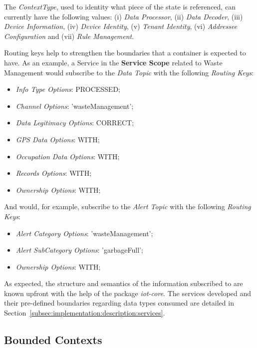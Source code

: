 The \textit{ContextType}, used to identity what piece of the state is referenced, can currently have the following values: (i) \textit{Data Processor}, (ii) \textit{Data Decoder}, (iii) \textit{Device Information}, (iv) \textit{Device Identity}, (v) \textit{Tenant Identity}, (vi) \textit{Addressee Configuration} and (vii) \textit{Rule Management}.

Routing keys help to strengthen the boundaries that a container is expected to have. As an example, a Service in the \textbf{Service Scope} related to Waste Management would subscribe to the \textit{Data Topic} with the following \textit{Routing Keys}: 

\begin{itemize}
   \item \textit{Info Type Options}: PROCESSED;
   \item \textit{Channel Options}: 'wasteManagement';
   \item \textit{Data Legitimacy Options}: CORRECT;
   \item \textit{GPS Data Options}: WITH;
   \item \textit{Occupation Data Options}: WITH;
   \item \textit{Records Options}: WITH;
   \item \textit{Ownership Options}: WITH;
\end{itemize}

And would, for example, subscribe to the \textit{Alert Topic} with the following \textit{Routing Keys}:

\begin{itemize}
   \item \textit{Alert Category Options}: 'wasteManagement';
   \item \textit{Alert SubCategory Options}: 'garbageFull'; 
   \item \textit{Ownership Options}: WITH;
\end{itemize}

As expected, the structure and semantics of the information subscribed to are known upfront with the help of the package \textit{iot-core}. The services developed and their pre-defined boundaries regarding data types consumed are detailed in Section~\ref{subsec:implementation:description:services}.

\subsection{Bounded Contexts}
\label{subsec:design:domain:bounded_contexts}


